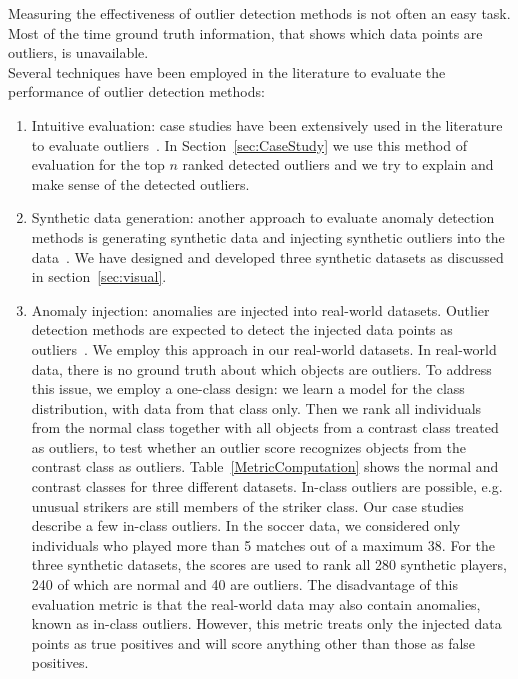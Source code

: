 {				Measuring the effectiveness of outlier detection methods is not often an easy task. Most of the time ground truth information, that shows which data points are outliers, is unavailable. \\
				Several techniques have been employed in the literature to evaluate the performance of outlier detection methods:
				\begin{enumerate}
					\item Intuitive evaluation: case studies have been extensively used in the literature to evaluate outliers~\citep{aggarwal2013}. In Section~\ref{sec:CaseStudy} we use this method of evaluation for the top $n$ ranked detected outliers and we try to explain and make sense of the detected outliers. 	
					\item Synthetic data generation: another approach to evaluate anomaly detection methods is generating synthetic data and injecting synthetic outliers into the data~\citep{aggarwal2013}. We have designed and developed three synthetic datasets as discussed in section~\ref{sec:visual}.
					\item Anomaly injection: anomalies are injected into real-world datasets. Outlier detection methods are expected to detect the injected data points as outliers~\citep{Akoglu2015}. We employ this approach in our real-world datasets.
						In real-world data, there is no ground truth about which objects are outliers. To address this issue, we employ a one-class design: we learn a model for the class distribution, with data from that class only. 
						Then we rank all individuals from the normal class together with all objects from a contrast class treated as outliers, to test whether an outlier score recognizes objects from the contrast class as outliers.
						Table~\ref{MetricComputation} shows the normal and contrast classes for three different datasets.  In-class outliers are possible, e.g. unusual strikers are still members of the striker class. Our case studies describe a few in-class outliers. In the soccer data, we considered only individuals who played more than 5 matches out of a maximum 38. For the three synthetic datasets, the scores are used to rank all 280 synthetic  players, 240 of which are normal and 40 are outliers.
					The disadvantage of this evaluation metric is that the real-world data may also contain anomalies, known as in-class outliers. However, this metric treats only the injected data points as true positives and will score anything other than those as false positives.
				\end{enumerate}
			
}
